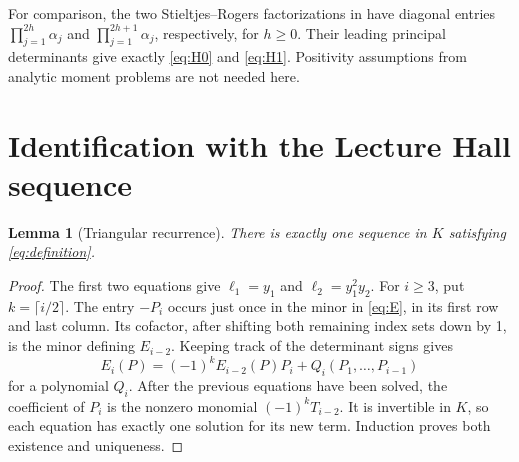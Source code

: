 \documentclass[11pt]{article}
\newtheorem{lemma}[theorem]{Lemma}
\theoremstyle{remark}
\newcommand{\LH}{\ell}
\begin{document}
For comparison, the two Stieltjes--Rogers factorizations in
\cite[Theorem 9.5(b,c)]{Sokal} have diagonal entries
$\prod_{j=1}^{2h}\alpha_j$ and $\prod_{j=1}^{2h+1}\alpha_j$,
respectively, for $h\ge0$. Their leading principal determinants give
exactly \eqref{eq:H0} and \eqref{eq:H1}. Positivity assumptions from
analytic moment problems are not needed here.

\section{Identification with the Lecture Hall sequence}

\begin{lemma}[Triangular recurrence]\label{lem:unique}
There is exactly one sequence in $K$ satisfying \eqref{eq:definition}.
\end{lemma}
\begin{proof}
The first two equations give $\LH_1=y_1$ and $\LH_2=y_1^2y_2$.
For $i\ge3$, put $k=\lceil i/2\rceil$. The entry $-P_i$ occurs just
once in the minor in \eqref{eq:E}, in its first row and last column.
Its cofactor, after shifting both remaining index sets down by 1, is
the minor defining $E_{i-2}$. Keeping track of the determinant signs
gives
\[
 E_i(P)=(-1)^kE_{i-2}(P)P_i+Q_i(P_1,\ldots,P_{i-1})
\]
for a polynomial $Q_i$. After the previous equations have been solved,
the coefficient of $P_i$ is the nonzero monomial $(-1)^kT_{i-2}$.
It is invertible in $K$, so each equation has exactly one solution for
its new term. Induction proves both existence and uniqueness.
\end{proof}
\end{document}
